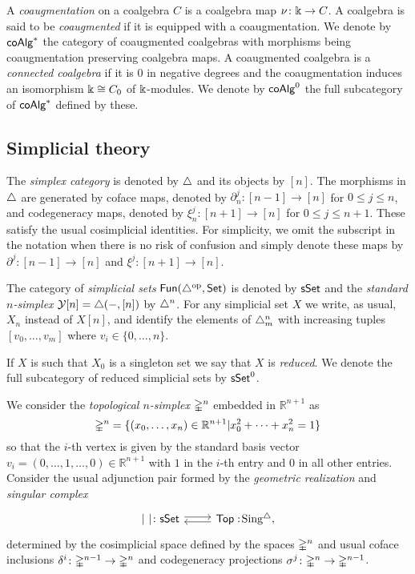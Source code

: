 A \textit{coaugmentation} on a coalgebra $C$ is a coalgebra map $\nu \colon \Bbbk \to C$.
A coalgebra is said to be \textit{coaugmented} if it is equipped with a coaugmentation.
We denote by $\mathsf{coAlg}^\ast$ the category of coaugmented coalgebras with morphisms being coaugmentation preserving coalgebra maps.
A coaugmented coalgebra is a \textit{connected coalgebra} if it is $0$ in negative degrees and the coaugmentation induces an isomorphism $\Bbbk \cong C_0$ of $\Bbbk$-modules.
We denote by $\mathsf{coAlg}^0$ the full subcategory of $\mathsf{coAlg}^\ast$ defined by these.

\subsection{Simplicial theory}\label{ss:simplicial}

The \textit{simplex category} is denoted by $\triangle$ and its objects by $[n]$. The morphisms in $\triangle$ are generated by coface maps, denoted by $\partial^{j}_n \colon [n-1] \to [n]$ for $0\leq j \leq n$, and codegeneracy maps, denoted by $\xi^{j}_n \colon [n+1] \to [n]$ for $0 \leq j \leq n+1$. These satisfy the usual cosimplicial identities. For simplicity, we omit the subscript in the notation when there is no risk of confusion and simply denote these maps by $\partial^{j} \colon [n-1] \to [n]$ and $\xi^{j} \colon [n+1] \to [n]$.

The category of \textit{simplicial sets} $\mathsf{Fun}(\triangle^{\mathrm{op}}, \mathsf{Set})$ is denoted by $\mathsf{sSet}$ and the \textit{standard $n$-simplex} $\operatorname{\mathcal{Y}} [n] = \triangle(-, [n])$ by $\triangle^n$.
For any simplicial set $X$ we write, as usual, $X_n$ instead of $X[n]$, and identify the elements of $\triangle^n_m$ with increasing tuples $[v_0, \dots, v_m]$ where $v_i \in \{0, \dots, n\}$.

If $X$ is such that $X_0$ is a singleton set we say that $X$ is \textit{reduced}.
We denote the full subcategory of reduced simplicial sets by $\mathsf{sSet}^0$.

We consider the \textit{topological $n$-simplex} $\mathbb{\Delta}^n$ embedded in $\mathbb{R}^{n+1}$ as 
\[ \mathbb{\Delta}^n = \{ (x_0, \dots, x_n) \in \mathbb{R}^{n+1} | x_0^2 + \dots + x_n^2=1\} \]
so that the $i$-th vertex is given by the standard basis vector $v_i=(0,\ldots,1, \ldots,0) \in \mathbb{R}^{n+1}$ with $1$ in the $i$-th entry and $0$ in all other entries. Consider the usual adjunction pair formed by the \textit{geometric realization} and \textit{singular complex}
\[
\begin{tikzcd}
	\bars{\ } \colon \sSet \arrow[r, shift left=.5ex] &
	\Top :\! \sSing, \arrow[l, shift left=.5ex]
\end{tikzcd}
\]
determined by the cosimplicial space defined by the spaces $\mathbb{\Delta}^n$ and usual coface inclusions $\delta^i \colon \mathbb{\Delta}^{n-1} \to \mathbb{\Delta}^n$ and codegeneracy projections $\sigma^j \colon \mathbb{\Delta}^n \to \mathbb{\Delta}^{n-1}$.

